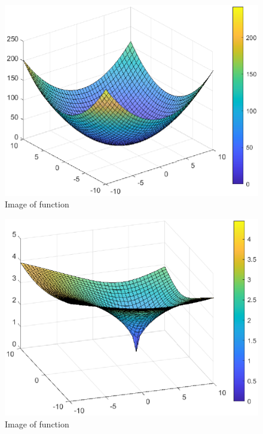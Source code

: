 \documentclass{CSArticle}[english]
\begin{document}
\begin{figure}[h!]
\centering
\includegraphics[scale=0.4]{figure/Q2-sphere.eps}
\caption{Image of function }
\label{fig:Q1_crite}
\end{figure}\par


\begin{figure}[h!]
\centering
\includegraphics[scale=0.4]{figure/Q2-nondiff.eps}
\caption{Image of function }
\label{fig:Q1_crite}
\end{figure}\par
\end{document}
